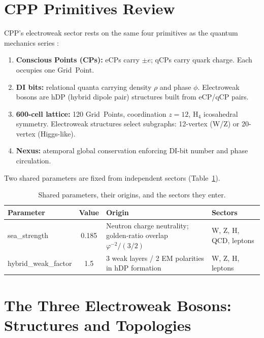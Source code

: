 \documentclass[11pt,a4paper]{article}
\newcommand{\phig}{\varphi}   %
\begin{document}
\section{CPP Primitives Review}

CPP's electroweak sector rests on the same four primitives as the
quantum mechanics series \citep{cpp2040a}:

\begin{enumerate}
\item \textbf{Conscious Points (CPs):} eCPs carry $\pm e$; qCPs carry
  quark charge.  Each occupies one Grid~Point.
\item \textbf{DI bits:} relational quanta carrying density $\rho$ and
  phase $\phi$.  Electroweak bosons are hDP (hybrid dipole pair)
  structures built from eCP/qCP pairs.
\item \textbf{600-cell lattice:} 120 Grid~Points, coordination $z=12$,
  H$_4$ icosahedral symmetry.  Electroweak structures select
  subgraphs: 12-vertex (W/Z) or 20-vertex (Higgs-like).
\item \textbf{Nexus:} atemporal global conservation enforcing DI-bit
  number and phase circulation.
\end{enumerate}

Two shared parameters are fixed from independent sectors
(Table~\ref{tab:params}).

\begin{table}[H]
\centering
\caption{Shared parameters, their origins, and the sectors they enter.}
\label{tab:params}
\begin{tabular}{@{}lcll@{}}
\toprule
Parameter & Value & Origin & Sectors \\
\midrule
sea\_strength & 0.185 & Neutron charge neutrality; golden-ratio
  overlap $\phig^{-2}/(3/2)$ & W, Z, H, QCD, leptons \\
hybrid\_weak\_factor & 1.5 & 3 weak layers / 2 EM polarities in hDP
  formation & W, Z, H, leptons \\
\bottomrule
\end{tabular}
\end{table}

\section{The Three Electroweak Bosons: Structures and Topologies}
\end{document}
